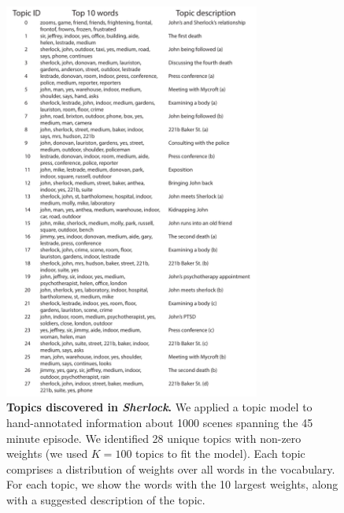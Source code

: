\documentclass{article}
\begin{document}
\begin{figure}[tp]
\centering
\includegraphics[width=0.75\textwidth]{figs/topic_words}
\caption{\small \textbf{Topics discovered in \textit{Sherlock}.} We applied a topic model to hand-annotated information about 1000 scenes spanning the 45 minute episode.  We identified 28 unique topics with non-zero weights (we used $K=100$ topics to fit the model).  Each topic comprises a distribution of weights over all words in the vocabulary.  For each topic, we show the words with the 10 largest weights, along with a suggested description of the topic.}
\label{fig:topics}
\end{figure}
\end{document}
